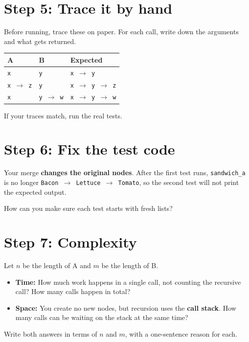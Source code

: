 \documentclass[11pt]{article}
\begin{document}
\section*{Step 5: Trace it by hand}

Before running, trace these on paper. For each call, write down the arguments and
what gets returned.

\begin{center}
\begin{tabular}{lll}
\toprule
\textbf{A} & \textbf{B} & \textbf{Expected} \\
\midrule
\texttt{x}              & \texttt{y}              & \texttt{x $\to$ y} \\
\texttt{x $\to$ z}      & \texttt{y}              & \texttt{x $\to$ y $\to$ z} \\
\texttt{x}              & \texttt{y $\to$ w}      & \texttt{x $\to$ y $\to$ w} \\
\bottomrule
\end{tabular}
\end{center}

\noindent If your traces match, run the real tests.

\section*{Step 6: Fix the test code}

Your merge \textbf{changes the original nodes}. After the first test runs,
\texttt{sandwich\_a} is no longer \texttt{Bacon $\to$ Lettuce $\to$ Tomato}, so the
second test will not print the expected output.

\begin{question}
How can you make sure each test starts with fresh lists?
\end{question}

\section*{Step 7: Complexity}

Let $n$ be the length of A and $m$ be the length of B.

\begin{itemize}
  \item \textbf{Time:} How much work happens in a single call, not counting the
        recursive call? How many calls happen in total?
  \item \textbf{Space:} You create no new nodes, but recursion uses the
        \textbf{call stack}. How many calls can be waiting on the stack at the same
        time?
\end{itemize}

\noindent Write both answers in terms of $n$ and $m$, with a one-sentence reason
for each.
\end{document}
